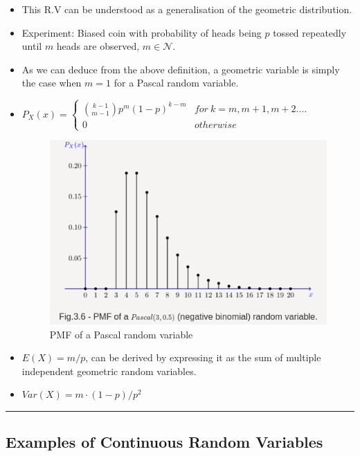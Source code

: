 \begin{itemize}
\item
  This R.V can be understood as a generalisation of the geometric
  distribution.
\item
  Experiment: Biased coin with probability of heads being \(p\) tossed
  repeatedly until \(m\) heads are observed, \(m \in \mathcal{N}\).
\item
  As we can deduce from the above definition, a geometric variable is
  simply the case when \(m = 1\) for a Pascal random variable.
\item
  \(P_X(x) = \begin{cases}{{k-1}\choose{m-1}} p^m(1-p)^{k-m} & for \ k=m, m+1, m+2....\\0 & otherwise\end{cases}\)

  \begin{figure}[''h!'']
  \centering
  \includegraphics{../Screenshot from 2021-08-07 09-44-36.png}
  \caption{PMF of a Pascal random variable}
  \end{figure}
\item
  \(E(X) = m/p\), can be derived by expressing it as the sum of multiple
  independent geometric random variables.
\item
  \(Var(X) = m\cdot (1-p)/p^2\)
\end{itemize}

\begin{center}\rule{0.5\linewidth}{0.5pt}\end{center}

\hypertarget{examples-of-continuous-random-variables}{%
\subsection{Examples of Continuous Random
Variables}\label{examples-of-continuous-random-variables}}

